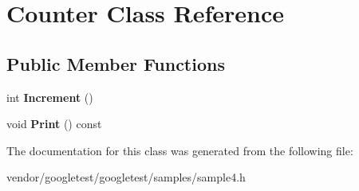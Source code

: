 \hypertarget{classCounter}{}\section{Counter Class Reference}
\label{classCounter}
\subsection*{Public Member Functions}
\begin{DoxyCompactItemize}
\item 
int {\bfseries Increment} ()\hypertarget{classCounter_a0a0ca9fdb580a2aec9a5a62ebed2b5ab}{}\label{classCounter_a0a0ca9fdb580a2aec9a5a62ebed2b5ab}

\item 
void {\bfseries Print} () const \hypertarget{classCounter_a435e7bc009682cea425e71acd490f3c4}{}\label{classCounter_a435e7bc009682cea425e71acd490f3c4}

\end{DoxyCompactItemize}


The documentation for this class was generated from the following file\+:\begin{DoxyCompactItemize}
\item 
vendor/googletest/googletest/samples/sample4.\+h\end{DoxyCompactItemize}
